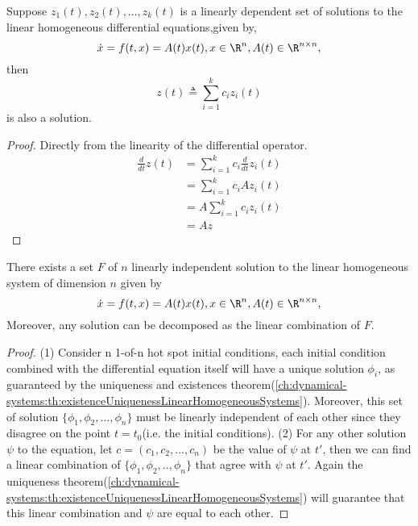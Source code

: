 \begin{refsection}
\begin{lemma}\label{ch:dynamical-systems:th:linearityOfSolutionToLinearHomogeneousSystems}
Suppose $z_1(t),z_2(t),...,z_k(t)$ is a linearly dependent set of solutions to the linear homogeneous differential equations,given by,
$$\dot{x}=f(t,x) = A(t)x(t), x\in \R^n, A(t)\in \R^{n\times n},$$
then $$z(t) \triangleq \sum_{i=1}^k c_iz_i(t)$$ is also a solution. 
\end{lemma}
\begin{proof}
Directly from the linearity of the differential operator. 
\begin{align*}
\frac{d}{dt}z(t) &= \sum_{i=1}^k c_i \frac{d}{dt}z_i(t) \\
&= \sum_{i=1}^k c_i Az_i(t) \\
&= A\sum_{i=1}^k c_i z_i(t) \\
&= Az
\end{align*}
\end{proof}

\begin{theorem}\label{ch:dynamical-systems:th:FundamentalSolutionPropertyLinearHomogeneousSystem}
\cite[18]{sanchez1968ordinary}There exists a set $F$ of $n$ linearly independent solution to the linear homogeneous system of dimension $n$ given by
$$\dot{x}=f(t,x) = A(t)x(t), x\in \R^n, A(t)\in \R^{n\times n},$$
Moreover, any solution can be decomposed as the linear combination of $F$. 
\end{theorem}
\begin{proof}
(1) Consider n 1-of-n hot spot initial conditions, each initial condition combined with the differential equation itself will have a unique solution $\phi_i$, as guaranteed by the uniqueness and existences theorem(\autoref{ch:dynamical-systems:th:existenceUniquenessLinearHomogeneousSystems}). Moreover, this set of solution $\{\phi_1,\phi_2,...,\phi_n\}$ must be linearly independent of each other since they disagree on the point $t=t_0$(i.e. the initial conditions). (2) For any other solution $\psi$ to the equation, let $c=(c_1,c_2,...,c_n)$ be the value of $\psi$ at $t'$, then we can find a linear combination of $\{\phi_1,\phi_2,..,\phi_n\}$ that agree with $\psi$ at $t'$. Again the uniqueness theorem(\autoref{ch:dynamical-systems:th:existenceUniquenessLinearHomogeneousSystems}) will guarantee that this linear combination and $\psi$ are equal to each other. 
\end{proof}


\end{refsection}
